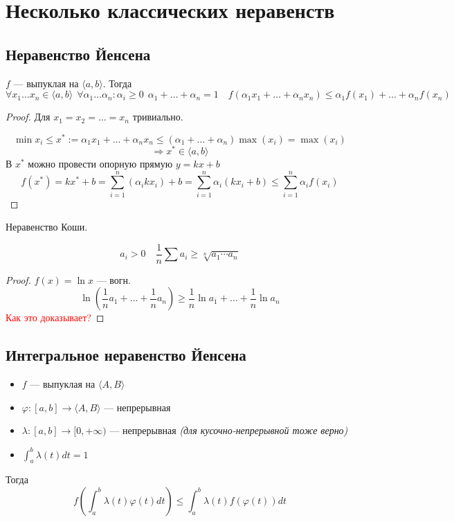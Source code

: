 

\cfoot{}

\renewcommand{\thesubsection}{\arabic{subsection}.}



\section*{Несколько классических неравенств}

\subsection{Неравенство Йенсена}

$f$ --- выпуклая на $\langle a,b \rangle$. Тогда
$$\forall x_1\ldots x_n\in\langle a,b \rangle \ \ \forall \alpha_1\ldots \alpha_n : \alpha_i\geq 0 \ \ \alpha_1+\ldots+\alpha_n=1 \quad f(\alpha_1x_1+\ldots+\alpha_nx_n)\leq \alpha_1f(x_1)+\ldots+\alpha_nf(x_n)$$

\begin{proof}
    Для $x_1=x_2=\ldots=x_n$ тривиально.
    
    $$\min x_i\leq x^*:=\alpha_1x_1+\ldots+\alpha_nx_n\leq(\alpha_1+\ldots+\alpha_n)\max(x_i)=\max(x_i)$$
    $$\Rightarrow x^*\in \langle a,b \rangle$$
    В $x^*$ можно провести опорную прямую $y=kx+b$
    $$f(x^*)=kx^*+b=\sum_{i=1}^n (\alpha_ikx_i) + b = \sum_{i=1}^n \alpha_i(kx_i + b)\leq\sum_{i=1}^n \alpha_i f(x_i)$$
\end{proof}

\begin{consequence}
    Неравенство Коши.

    $$a_i>0 \quad \frac{1}{n} \sum a_i \geq \sqrt[n]{a_1\cdots a_n}$$
\end{consequence}
\begin{proof}
    $f(x)=\ln x$ --- вогн.
    $$\ln\left(\frac{1}{n}a_1+\ldots+\frac{1}{n}a_n\right)\geq\frac{1}{n}\ln a_1+\ldots+\frac{1}{n}\ln a_n$$
    \textcolor{red}{Как это доказывает?}
\end{proof}

\subsection{Интегральное неравенство Йенсена}
\begin{itemize}
    \item $f$ --- выпуклая на $\langle A,B \rangle$
    \item $\varphi : [a,b]\to\langle A,B \rangle$ --- непрерывная
    \item $\lambda:[a,b]\to[0,+\infty)$ --- непрерывная \textit{(для кусочно-непрерывной тоже верно)}
    \item $\int_a^b \lambda(t)dt=1$
\end{itemize}
Тогда
$$f\left(\int_a^b \lambda(t)\varphi(t)dt \right) \leq \int_a^b \lambda(t)f(\varphi(t))dt$$

